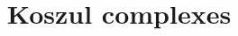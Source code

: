 \documentclass{ximera}
\title{Koszul complexes}
\begin{document}
\begin{abstract}

\end{abstract}
\maketitle

\end{document}
